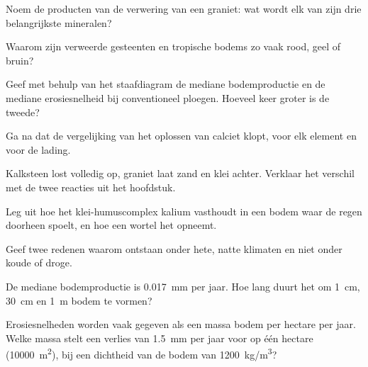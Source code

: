 \begin{exercise}[$\star$]\label{exo:g10:soil-formation:3}
Noem de producten van de verwering van een graniet: wat wordt elk van zijn drie
belangrijkste mineralen?
\end{exercise}

\begin{exercise}[$\star$]\label{exo:g10:soil-formation:4}
Waarom zijn verweerde gesteenten en tropische bodems zo vaak rood, geel of bruin?
\end{exercise}

\begin{exercise}[$\star$]\label{exo:g10:soil-formation:5}
Geef met behulp van het staafdiagram de mediane bodemproductie en de mediane
erosiesnelheid bij conventioneel ploegen. Hoeveel keer groter is de
tweede?
\end{exercise}

\begin{exercise}[$\star\star$]\label{exo:g10:soil-formation:6}
Ga na dat de vergelijking van het oplossen van calciet klopt, voor elk element
en voor de lading.
\end{exercise}

\begin{exercise}[$\star\star$]\label{exo:g10:soil-formation:7}
Kalksteen lost volledig op, graniet laat zand en klei achter. Verklaar het
verschil met de twee reacties uit het hoofdstuk.
\end{exercise}

\begin{exercise}[$\star\star$]\label{exo:g10:soil-formation:8}
Leg uit hoe het klei-humuscomplex kalium vasthoudt in een bodem waar de regen
doorheen spoelt, en hoe een wortel het opneemt.
\end{exercise}

\begin{exercise}[$\star\star$]\label{exo:g10:soil-formation:9}
Geef twee redenen waarom  ontstaan onder hete, natte klimaten en niet
onder koude of droge.
\end{exercise}

\begin{exercise}[$\star\star$]\label{exo:g10:soil-formation:10}
De mediane bodemproductie is \qty{0.017}{mm} per jaar. Hoe lang duurt het om
\qty{1}{cm}, \qty{30}{cm} en \qty{1}{m} bodem te vormen?
\end{exercise}

\begin{exercise}[$\star\star$]\label{exo:g10:soil-formation:11}
Erosiesnelheden worden vaak gegeven als een massa bodem per hectare per jaar.
Welke massa stelt een verlies van \qty{1.5}{mm} per jaar voor op één hectare
(\qty{10000}{m^2}), bij een dichtheid van de bodem van \qty{1200}{kg/m^3}?
\end{exercise}

